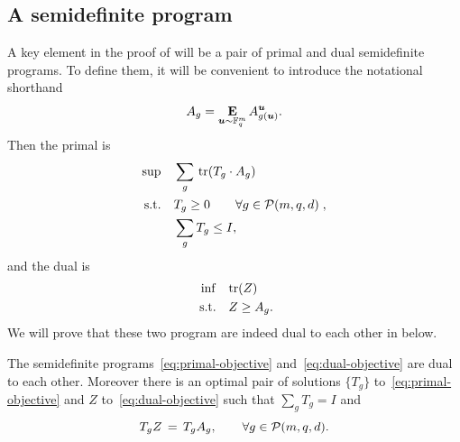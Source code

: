 \subsection{A semidefinite program}

A key element in the proof of  will be a pair of primal and dual semidefinite programs. 
To define them, it will be convenient to introduce the notational shorthand
\begin{equation*}
A_g = \mathop{\bf E\/}_{\boldsymbol{u} \sim \mathbb F_q^m} A^{\boldsymbol{u}}_{g(\boldsymbol{u})}.
\end{equation*}
Then the primal is
\begin{align}
 \sup &\quad \sum_g \,\mathrm{tr}(T_g \cdot A_g) \label{eq:primal-objective}\\
  \text{s.t.} &\quad   T_g \geq 0\qquad\forall g\in\mathcal{P}(m, q, d)\;,\notag\\
	&\quad \sum_g T_g \leq I,\notag
\end{align}
and the dual is
\begin{align}
  \inf &\quad \mathrm{tr}(Z) \label{eq:dual-objective}\\
 \text{ s.t.} &\quad Z \geq A_g. \label{eq:dual-constraint}
\end{align}
We will prove that these two program are indeed dual to each other in  below.

\begin{lemma}\label{lem:sdp}
The semidefinite programs~\eqref{eq:primal-objective} and~\eqref{eq:dual-objective} are dual to each other. 
Moreover there is an optimal pair of solutions $\{T_g\}$ to~\eqref{eq:primal-objective} and $Z$ to~\eqref{eq:dual-objective} such that $\sum_g T_g = I$ and  
\begin{equation}\label{eq:slater}
T_g Z  \,=\, T_g {A_g},\qquad\forall g\in \mathcal{P}(m, q, d).
\end{equation}
\end{lemma}

